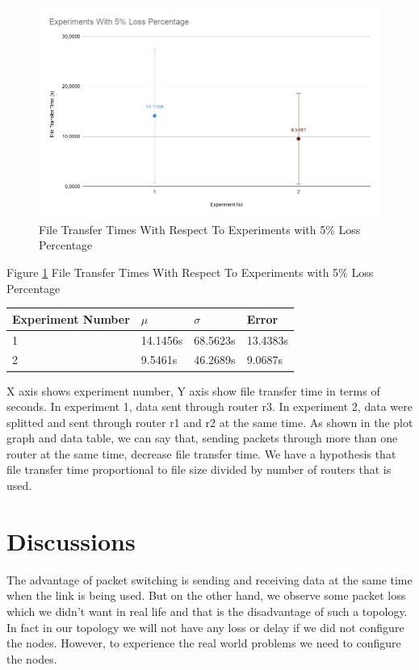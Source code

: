 \documentclass[conference]{IEEEtran}
\begin{document}
\begin{figure}[h]
  \includegraphics[width=\linewidth]{experimentPlot.png}
  \caption{File Transfer Times With Respect To Experiments with 5\% Loss Percentage}
  \label{fig:plot}
\end{figure}

Figure \ref{fig:plot} File Transfer Times With Respect To Experiments with 5\% Loss Percentage

\begin{table}[h]
\centering
\begin{tabular}{|l|l|l|l|}
\hline
Experiment Number & $\mu$ & $\sigma$ & Error \\ \hline
1 & 14.1456s  & 68.5623s     & 13.4383s     \\ \hline
2 & 9.5461s & 46.2689s     & 9.0687s     \\ \hline
\end{tabular}
\end{table}

X axis shows experiment number, Y axis show file transfer time in terms of seconds. In experiment 1, data sent through router r3. In experiment 2, data were splitted and sent through router r1 and r2 at the same time. As shown in the plot graph and data table, we can say that, sending packets through more than one router at the same time, decrease file transfer time. We have a hypothesis that file transfer time proportional to file size divided by number of routers that is used.

\section{Discussions}

The advantage of packet switching is sending and receiving data at the same time when the link is being used. But on the other hand, we observe some packet loss which we didn't want in real life and that is the disadvantage of such a topology. In fact in our topology we will not have any loss or delay if we did not configure the nodes. However, to experience the real world problems we need to configure the nodes.\\
\end{document}
